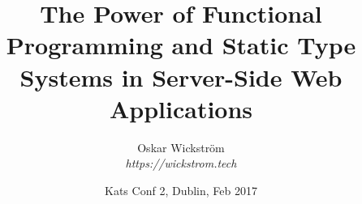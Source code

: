 \title{The Power of Functional Programming and Static Type Systems in Server-Side Web Applications}
\author{Oskar Wickstr\"{o}m\\\textit{https://wickstrom.tech}}
\date{Kats Conf 2, Dublin, Feb 2017}
\newcommand{\twitterhandle}{owickstrom}
